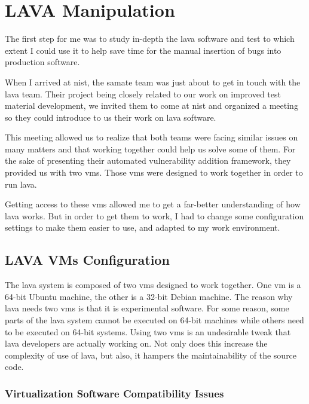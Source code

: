 \section{LAVA Manipulation}

The first step for me was to study in-depth the \gls{lava} software and test to which extent I could use it to help save time for the manual insertion of bugs into production software.

When I arrived at \gls{nist}, the \gls{samate} team was just about to get in touch with the \gls{lava} team. Their project being closely related to our work on improved test material development, we invited them to come at \gls{nist} and organized a meeting so they could introduce to us their work on \gls{lava} software.

This meeting allowed us to realize that both teams were facing similar issues on many matters and that working together could help us solve some of them. For the sake of presenting their automated vulnerability addition framework, they provided us with two \glspl{vm}. Those \glspl{vm} were designed to work together in order to run \gls{lava}.

Getting access to these \glspl{vm} allowed me to get a far-better understanding of how \gls{lava} works. But in order to get them to work, I had to change some configuration settings to make them easier to use, and adapted to my work environment.

\subsection{LAVA VMs Configuration}

The \gls{lava} system is composed of two \glspl{vm} designed to work together. One \gls{vm} is a 64-bit Ubuntu machine, the other is a 32-bit Debian machine. The reason why \gls{lava} needs two \glspl{vm} is that it is experimental software. For some reason, some parts of the \gls{lava} system cannot be executed on 64-bit machines while others need to be executed on 64-bit systems. Using two \glspl{vm} is an undesirable tweak that \gls{lava} developers are actually working on. Not only does this increase the complexity of use of \gls{lava}, but also, it hampers the maintainability of the source code.

\subsubsection{Virtualization Software Compatibility Issues}

